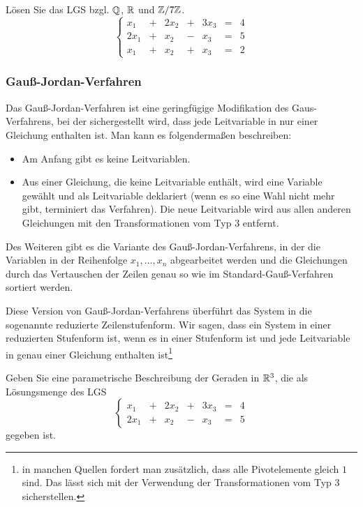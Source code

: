 \begin{appendices}
\begin{bsp}
	Lösen Sie das LGS bzgl. $\mathbb Q$, $\mathbb R$ und $\mathbb Z / 7 \mathbb Z$. 
	\[
	\left\{
	\begin{array}{ccccccc}
		 x_1 &  +&  2 x_2 & + & 3 x_3 &  = & 4
\\		 2 x_1 & + & x_2 & -&  x_3 & =&  5
\\		 x_1 & + & x_2 & + & x_3 & = & 2
	\end{array}\right. 
	\]
\end{bsp} 

\subsubsection{Gauß-Jordan-Verfahren}

Das Gauß-Jordan-Verfahren ist eine geringfügige Modifikation des Gaus-Verfahrens, bei der sichergestellt wird, dass jede Leitvariable in nur einer Gleichung enthalten ist. Man kann es folgendermaßen beschreiben: 

\begin{framed}
\begin{itemize} 
	\item Am Anfang gibt es keine Leitvariablen. 
	\item Aus einer Gleichung, die keine Leitvariable enthält, wird eine Variable gewählt und als Leitvariable deklariert (wenn es so eine Wahl nicht mehr gibt, terminiert das Verfahren). Die neue Leitvariable wird aus allen anderen Gleichungen mit den Transformationen vom Typ 3 entfernt. 
\end{itemize} 
\end{framed} 

Des Weiteren gibt es die Variante des Gauß-Jordan-Verfahrens, in der die Variablen in der Reihenfolge $x_1,\ldots,x_n$ abgearbeitet werden und die Gleichungen durch das Vertauschen der Zeilen genau so wie im Standard-Gauß-Verfahren sortiert werden. 

Diese Version von Gauß-Jordan-Verfahrens  überführt das System in die sogenannte reduzierte Zeilenstufenform. Wir sagen, dass ein System in einer reduzierten Stufenform ist, wenn es in einer Stufenform ist und jede Leitvariable in genau einer Gleichung enthalten ist\footnote{in manchen Quellen fordert man zusätzlich, dass alle Pivotelemente gleich $1$ sind. Das lässt sich mit der Verwendung der Transformationen vom Typ 3 sicherstellen.}

\begin{bsp}
	Geben Sie eine parametrische Beschreibung der Geraden in $\mathbb R^3$, die als Lösungsmenge des LGS
	\[
	\left\{
\begin{array}{ccccccc}
	x_1 &  +&  2 x_2 & + & 3 x_3 &  = & 4
	\\		 2 x_1 & + & x_2 & -&  x_3 & =&  5
\end{array}\right. 
	\]
	gegeben ist. 
\end{bsp} 

\end{appendices}
